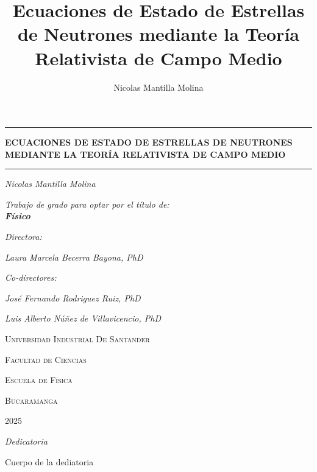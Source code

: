 \documentclass[8pt, letterpaper]{report}
\title{Ecuaciones de Estado de Estrellas de Neutrones mediante la Teoría Relativista de Campo Medio}
\author{Nicolas Mantilla Molina}
\begin{document}
\begin{titlepage}
    \centering
    \vspace{5cm}
    \rule{\textwidth}{2pt}
    {\LARGE\bfseries ECUACIONES DE ESTADO DE ESTRELLAS DE NEUTRONES MEDIANTE LA TEORÍA RELATIVISTA DE CAMPO MEDIO\par}
    \rule{\textwidth}{2pt}
    \vfill
    {\Large\itshape Nicolas Mantilla Molina\par}
    \vspace{1cm}
    {\Large\itshape Trabajo de grado para optar por el título de:  \\
    \textbf{Físico} \par}
    
    \vspace{.8 cm}
    {\Large\itshape Directora: \par}
    {\Large\itshape Laura Marcela Becerra Bayona, PhD \par}
    \vspace{0.5cm}
    {\Large\itshape Co-directores: \par}
    {\Large\itshape José Fernando Rodriguez Ruiz, PhD \par}
     {\Large\itshape Luis Alberto Núñez de Villavicencio, PhD \par}
    \vfill
    {\scshape\Large Universidad  Industrial De Santander \par}
    {\scshape\Large Facultad de Ciencias \par}
    {\scshape\Large Escuela de Física \par}
    {\scshape\Large Bucaramanga \par}
    {\scshape\Large 2025 \par}
\end{titlepage}


\clearpage
\thispagestyle{empty}
\vspace*{\fill}
\begin{flushright}
    {\Large\itshape Dedicatoria\par}
    \vspace{0.5cm}
	Cuerpo de la dediatoria
    
\end{flushright}
\vspace*{\fill}
\clearpage
\end{document}
